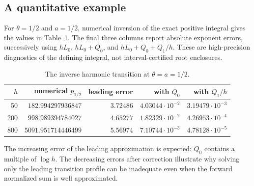 \subsection{A quantitative example}

For $\theta=1/2$ and $a=1/2$, numerical inversion of the exact
positive integral gives the values in Table~\ref{us:tab:inverse}.
The final three columns report absolute exponent errors, successively
using $hL_0$, $hL_0+Q_0$, and $hL_0+Q_0+Q_1/h$.
These are high-precision diagnostics of the defining integral,
not interval-certified root enclosures.

\begin{table}[htbp]
\centering
\caption{The inverse harmonic transition at $\theta=a=1/2$.}
\label{us:tab:inverse}
\begin{tabular}{@{}rrrrr@{}}
\toprule
$h$ & numerical $p_{1/2}$ & leading error & with $Q_0$ & with $Q_1/h$\\
\midrule
50 & $182.994297936847$ & $3.72486$ & $4.03044\cdot10^{-2}$ & $3.19479\cdot10^{-3}$\\
200 & $998.989394784027$ & $4.65277$ & $1.82329\cdot10^{-2}$ & $4.26953\cdot10^{-4}$\\
800 & $5091.951714446499$ & $5.56974$ & $7.10744\cdot10^{-3}$ & $4.78128\cdot10^{-5}$\\
\bottomrule
\end{tabular}
\end{table}

The increasing error of the leading approximation is expected:
$Q_0$ contains a multiple of $\log h$. The decreasing errors after
correction illustrate why solving only the leading transition profile
can be inadequate even when the forward normalized sum is well
approximated.
